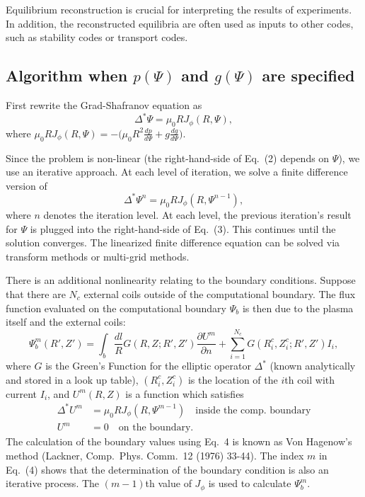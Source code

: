 \documentclass[paper=letter, fontsize=11pt]{scrartcl} %
\begin{document}
Equilibrium reconstruction is crucial for interpreting the results of experiments. In addition, the reconstructed equilibria are often used as inputs to other codes, such as stability codes or transport codes.  



\subsection{Algorithm when $p(\Psi)$ and $g(\Psi)$ are specified}



First rewrite the Grad-Shafranov equation as
\begin{equation}
\Delta^{*}\Psi = \mu_0 R J_{\phi} (R, \Psi),
\end{equation}
where $\mu_0 R J_{\phi} (R,\Psi) = - \big(\mu_0 R^2 \frac{d p}{d\Psi} + g \frac{d g}{d\Psi}\big)$.

Since the problem is non-linear (the right-hand-side of Eq.~(2) depends on $\Psi$), we use an iterative approach.  At each level of iteration, we solve a finite difference version of 
\begin{equation}
\Delta^{*}\Psi^{n} = \mu_0 R J_\phi (R, \Psi^{n-1}),
\end{equation}
where $n$ denotes the iteration level. At each level, the previous iteration's result for $\Psi$ is plugged into the right-hand-side of Eq.~(3).  This continues until the solution converges.  The linearized finite difference equation can be solved via transform methods or multi-grid methods.

There is an additional nonlinearity relating to the boundary conditions.  Suppose that there are $N_c$ external coils outside of the computational boundary.  The flux function evaluated on the computational boundary $\Psi_b$ is then due to the plasma itself and the external coils:
\begin{equation}
\Psi^m_b (R',Z') = \int_{b} \frac{dl}{R} G(R,Z; R',Z') \frac{\partial U^m}{\partial n} + \sum_{i=1}^{N_c} G(R_i^c,Z_i^c; R',Z') I_i,
\end{equation}
where $G$ is the Green's Function for the elliptic operator $\Delta^{*}$ (known analytically and stored in a look up table), $(R_i^c,Z_i^c)$ is the location of the $i$th coil with current $I_i$, and $U^m(R,Z)$ is a function which satisfies
\begin{align}
\Delta^{*} U^m &= \mu_0 R J_\phi (R, \Psi^{m-1}) \quad \mbox{inside the comp.~boundary} \\
U^m &= 0 \quad \mbox{on the boundary}.
\end{align}
The calculation of the boundary values using Eq.~4 is known as Von Hagenow's method (Lackner, Comp.~Phys. Comm.~12 (1976) 33-44).
The index $m$ in Eq.~(4) shows that the determination of the boundary condition is also an iterative process.  The $(m-1)$th value of $J_\phi$ is used to calculate $\Psi_b^m$.  
\end{document}
